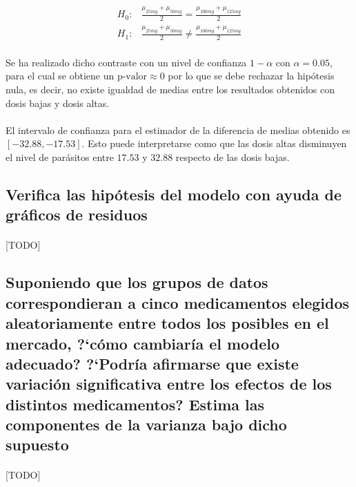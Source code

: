 \documentclass{article}
\begin{document}
      \begin{align}
        H_0:& \frac{\mu_{25mg} + \mu_{50mg}}{2} = \frac{\mu_{100mg} +\mu_{125mg}}{2} \\
        H_1:& \frac{\mu_{25mg} + \mu_{50mg}}{2} \neq \frac{\mu_{100mg} +\mu_{125mg}}{2}
      \end{align}

      \paragraph{}
      Se ha realizado dicho contraste con un nivel de confianza $1-\alpha$ con $\alpha = 0.05 $, para el cual se obtiene un $\text{p-valor}\approx 0$ por lo que se debe rechazar la hipótesis nula, es decir, no existe igualdad de medias entre los resultados obtenidos con dosis bajas y dosis altas.

      \paragraph{}
      El intervalo de confianza para el estimador de la diferencia de medias obtenido es $[-32.88, -17.53]$. Esto puede interpretarse como que las dosis altas disminuyen el nivel de parásitos entre $17.53$ y $32.88$ respecto de las dosis bajas.

    \subsection{Verifica las hipótesis del modelo con ayuda de gráficos de residuos}

      \paragraph{}
      [TODO]

    \subsection{Suponiendo que los grupos de datos correspondieran a cinco medicamentos elegidos aleatoriamente entre todos los posibles en el mercado, ?`cómo cambiaría el modelo adecuado? ?`Podría afirmarse que existe variación significativa entre los efectos de los distintos medicamentos? Estima las componentes de la varianza bajo dicho supuesto}

      \paragraph{}
      [TODO]
\end{document}
